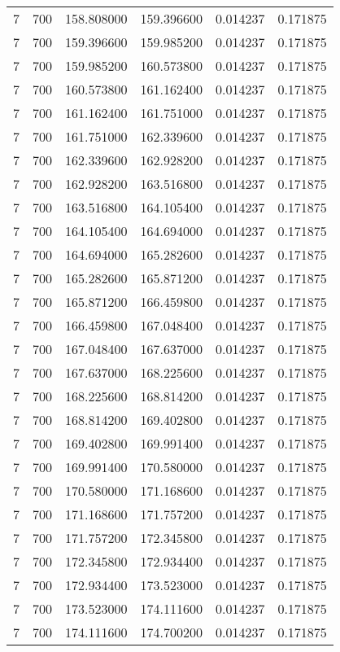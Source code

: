 \begin{longtable}{rrrrrr}
7 & 700 & 158.808000 & 159.396600 & 0.014237 & 0.171875 \\
7 & 700 & 159.396600 & 159.985200 & 0.014237 & 0.171875 \\
7 & 700 & 159.985200 & 160.573800 & 0.014237 & 0.171875 \\
7 & 700 & 160.573800 & 161.162400 & 0.014237 & 0.171875 \\
7 & 700 & 161.162400 & 161.751000 & 0.014237 & 0.171875 \\
7 & 700 & 161.751000 & 162.339600 & 0.014237 & 0.171875 \\
7 & 700 & 162.339600 & 162.928200 & 0.014237 & 0.171875 \\
7 & 700 & 162.928200 & 163.516800 & 0.014237 & 0.171875 \\
7 & 700 & 163.516800 & 164.105400 & 0.014237 & 0.171875 \\
7 & 700 & 164.105400 & 164.694000 & 0.014237 & 0.171875 \\
7 & 700 & 164.694000 & 165.282600 & 0.014237 & 0.171875 \\
7 & 700 & 165.282600 & 165.871200 & 0.014237 & 0.171875 \\
7 & 700 & 165.871200 & 166.459800 & 0.014237 & 0.171875 \\
7 & 700 & 166.459800 & 167.048400 & 0.014237 & 0.171875 \\
7 & 700 & 167.048400 & 167.637000 & 0.014237 & 0.171875 \\
7 & 700 & 167.637000 & 168.225600 & 0.014237 & 0.171875 \\
7 & 700 & 168.225600 & 168.814200 & 0.014237 & 0.171875 \\
7 & 700 & 168.814200 & 169.402800 & 0.014237 & 0.171875 \\
7 & 700 & 169.402800 & 169.991400 & 0.014237 & 0.171875 \\
7 & 700 & 169.991400 & 170.580000 & 0.014237 & 0.171875 \\
7 & 700 & 170.580000 & 171.168600 & 0.014237 & 0.171875 \\
7 & 700 & 171.168600 & 171.757200 & 0.014237 & 0.171875 \\
7 & 700 & 171.757200 & 172.345800 & 0.014237 & 0.171875 \\
7 & 700 & 172.345800 & 172.934400 & 0.014237 & 0.171875 \\
7 & 700 & 172.934400 & 173.523000 & 0.014237 & 0.171875 \\
7 & 700 & 173.523000 & 174.111600 & 0.014237 & 0.171875 \\
7 & 700 & 174.111600 & 174.700200 & 0.014237 & 0.171875 \\

\end{longtable}
